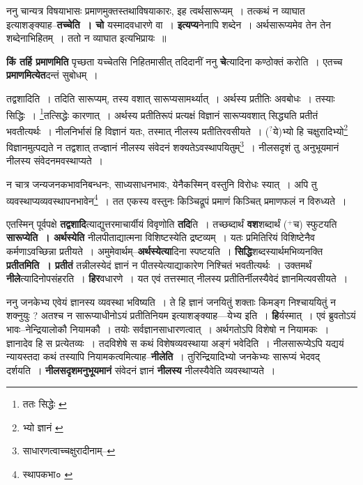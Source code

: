 \documentclass[article,12pt,a4paper]{memoir}
\newcommand{\unclear}[1]{($^{?}$#1)}
\newcommand{\add}[1]{($^{+}$#1)}
\begin{document}
	  \pstart ननु चान्यत्र विषयाभासः प्रमाणमुक्तस्तथाविषयाकारः, इह त्वर्थसारूप्यम् । तत्कथं न व्याघात इत्याशङ्क्याह--\textbf{तच्चेति । चो} यस्मादवधारणे वा । \textbf{इत्यप्य}नेनापि शब्देन । अर्थसारूप्यमेव तेन तेन शब्देनाभिहितम् । ततो न व्याघात इत्यभिप्रायः ॥
	\pend
      

	  \pstart \textbf{किं तर्हि प्रमाणमिति} पृच्छता यच्चेतसि निहितमासीत् तदिदानीं ननु \textbf{चे}त्यादिना कण्ठोक्तं करोति । एतच्च \textbf{प्रमाणमित्येत}दन्तं सुबोधम् ।
	\pend
      \leavevmode{}
	  \bigskip
	  \begingroup
	

	  \pstart तद्वशादिति । तदिति सारूप्यम्, तस्य वशात् सारूप्यसामर्थ्यात् । अर्थस्य प्रतीतिः अवबोधः । तस्याः सिद्धिः । \footnote{ततः सिद्धेः \cite{dp-msB}}तत्सिद्धेः कारणात् । अर्थस्य प्रतीतिरूपं प्रत्यक्षं विज्ञानं सारूप्यवशात् सिद्ध्यति प्रतीतं भवतीत्यर्थः । नीलनिर्भासं हि विज्ञानं यतः, तस्मात् नीलस्य प्रतीतिरवसीयते । \unclear{ये}भ्यो हि चक्षुरादिभ्यो\footnote{भ्यो ज्ञानं \cite{dp-msD} \cite{dp-msB}} विज्ञानमुत्पद्यते न तद्वशात् तज्ज्ञानं नीलस्य संवेदनं शक्यतेऽवस्थापयितुम्\footnote{साधारणत्वाच्चक्षुरादीनाम्--\cite{dp-msD-n}} । नीलसदृशं तु अनुभूयमानं नीलस्य संवेदनमवस्थाप्यते ।
	\pend
       

	  \pstart न चात्र जन्यजनकभावनिबन्धनः, साध्यसाधनभावः, येनैकस्मिन् वस्तुनि विरोधः स्यात् । अपि तु व्यवस्थाप्यव्यवस्थापनभावेन\footnote{स्थापकभा० \cite{dp-msA} \cite{dp-msB} \cite{dp-msC} \cite{dp-msD} \cite{dp-edP} \cite{dp-edE} \cite{dp-edH} \cite{dp-edN}} । तत एकस्य वस्तुनः किञ्चिद्रूपं प्रमाणं किञ्चित् प्रमाणफलं न विरुध्यते ।
	\pend
      
	  \endgroup
	

	  \pstart एतस्मिन् पूर्वपक्षे \textbf{तद्वशादि}त्याद्युत्तरमाचार्यीयं विवृणोति \textbf{तदि}ति । तच्छब्दार्थं \textbf{वश}शब्दार्थं \add{च} स्फुटयति \textbf{सारूप्येति । अर्थस्येति} नीलपीताद्यात्मना विशिष्टस्येति द्रष्टव्यम् । यतः प्रमितिरियं विशिष्टेनैव कर्मणाऽवच्छिन्ना प्रतीयते । अमुमेवार्थम्--\textbf{अर्थस्येत्या}दिना स्पष्टयति । \textbf{सिद्धि}शब्दस्यार्थमभिव्यनक्ति \textbf{प्रतीतमिति । प्रतीतं} तन्नीलस्येदं ज्ञानं न पीतस्येत्याद्याकारेण निश्चितं भवतीत्यर्थः । उक्तमर्थं \textbf{नीले}त्यादिनोपसंहरति । \textbf{हिर}वधारणे । यत एवं तत्तस्मात् नीलस्य प्रतीतिर्नीलस्यैवेदं ज्ञानमित्यवसीयते ।
	\pend
      

	  \pstart ननु जनकेभ्य एवेयं ज्ञानस्य व्यवस्था भविष्यति । ते हि ज्ञानं जनयितुं शक्ताः किमङ्ग निश्चाययितुं न शक्नुयुः ? अतश्च न सारूप्याधीनोऽयं प्रतीतिनियम इत्याशङ्क्याह—येभ्य इति । \textbf{हि}र्यस्मात् । एवं ब्रुवतोऽयं भावः--नेन्द्रियालोकौ नियामकौ । तयोः सर्वज्ञानसाधारणत्वात् । अर्थगतोऽपि विशेषो न नियामकः । ज्ञानादेव हि स प्रत्येतव्यः । तदविशेषे स कथं विशेषव्यवस्थाया अङ्गं भवेदिति । नीलसारूप्येऽपि यद्ययं न्यायस्तदा कथं तस्यापि नियामकत्वमित्याह--\textbf{नीलेति} । तुरिन्द्रियादिभ्यो जनकेभ्यः सारूप्यं भेदवद् दर्शयति । \textbf{नीलसदृशमनुभूयमानं} संवेदनं ज्ञानं \textbf{नीलस्य} नीलस्यैवेति व्यवस्थाप्यते ।
	\pend
      
\end{document}
